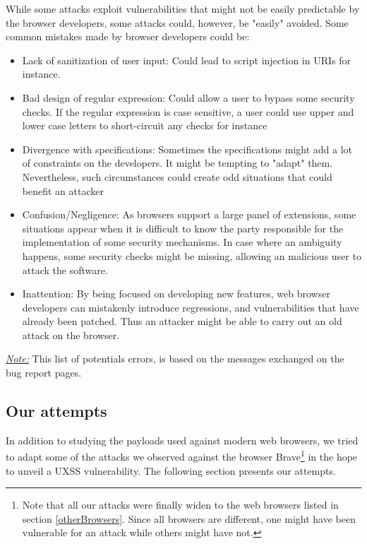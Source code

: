 \documentclass[journal]{IEEEtran}
\begin{document}
\medskip

While some attacks exploit vulnerabilities that might not be easily predictable by the browser developers, some attacks could, however, be "easily" avoided. Some common mistakes made by browser developers could be:

\begin{itemize}
\item Lack of sanitization of user input: Could lead to script injection in URIs for instance.
\item Bad design of regular expression: Could allow a user to bypass some security checks. If the regular expression is case sensitive, a user could use upper and lower case letters to short-circuit any checks for instance \cite{CVE-2012-0455}
\item Divergence with specifications: Sometimes the specifications might add a lot of constraints on the developers. It might be tempting to "adapt" them. Nevertheless, such circumstances could create odd situations that could benefit an attacker \cite{CVE-2012-3985}
\item Confusion/Negligence: As browsers support a large panel of extensions, some situations appear when it is difficult to know the party responsible for the implementation of some security mechanisms. In case where an ambiguity happens, some security checks might be missing, allowing an malicious user to attack the software.
\item Inattention: By being focused on developing new features, web browser developers can mistakenly introduce regressions, and vulnerabilities that have already been patched. Thus an attacker might be able to carry out an old attack on the browser.
\end{itemize}

\medskip

\underline{\emph{Note:}} This list of potentials errors, is based on the messages exchanged on the bug report pages. 

\subsection{Our attempts}

In addition to studying the payloads used against modern web browsers, we tried to adapt some of the attacks we observed against the browser Brave\footnote{Note that all our attacks were finally widen to the web browsers listed in section \ref{otherBrowsers}. Since all browsers are different, one might have been vulnerable for an attack while others might have not.} in the hope to unveil a UXSS vulnerability. The following section presents our attempts.
\end{document}
